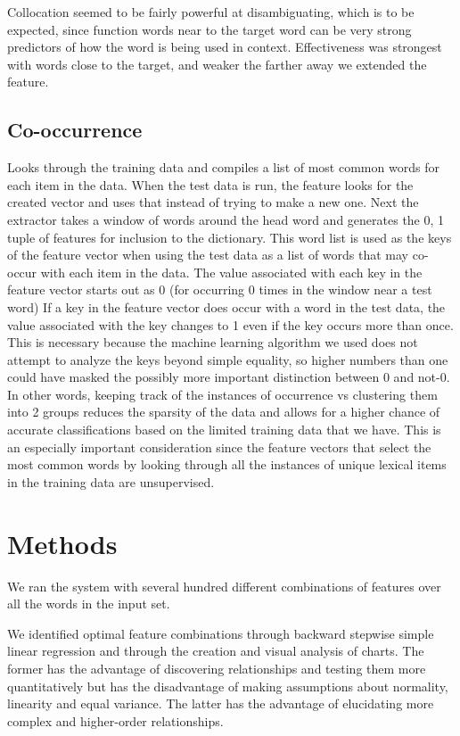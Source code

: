 \documentclass{article}
\begin{document}
Collocation seemed to be fairly powerful at disambiguating, which is to be
expected, since function words near to the target word can be very strong
predictors of how the word is being used in context.  Effectiveness was
strongest with words close to the target, and weaker the farther away we
extended the feature.

\subsection{Co-occurrence}

Looks through the training data and compiles a list of most common words for
each item in the data. When the test data is run, the feature looks for the
created vector and uses that instead of trying to make a new one. Next the
extractor takes a window of words around the head word and generates the 0, 1
tuple of features for inclusion to the dictionary. This word list is used as the
keys of the feature vector when using the test data as a list of words that may
co-occur with each item in the data. The value associated with each key in the
feature vector starts out as 0 (for occurring 0 times in the window near a test
word) If a key in the feature vector does occur with a word in the test data,
the value associated with the key changes to 1 even if the key occurs more than
once.  This is necessary because the machine learning algorithm we used does not
attempt to analyze the keys beyond simple equality, so higher numbers than one
could have masked the possibly more important distinction between 0 and not-0.
In other words, keeping track of the instances of occurrence vs clustering them
into 2 groups reduces the sparsity of the data and allows for a higher chance of
accurate classifications based on the limited training data that we have. This
is an especially important consideration since the feature vectors that select
the most common words by looking through all the instances of unique lexical
items in the training data are unsupervised.

\section{Methods}
\newcommand\few{few}

We ran the system with several hundred different combinations of features over
all the words in the input set.

We identified optimal feature combinations through backward stepwise simple
linear regression and through the creation and visual analysis of charts. The
former has the advantage of discovering relationships and testing them more
quantitatively but has the disadvantage of making assumptions about normality,
linearity and equal variance.  The latter has the advantage of elucidating more
complex and higher-order relationships.
\end{document}
